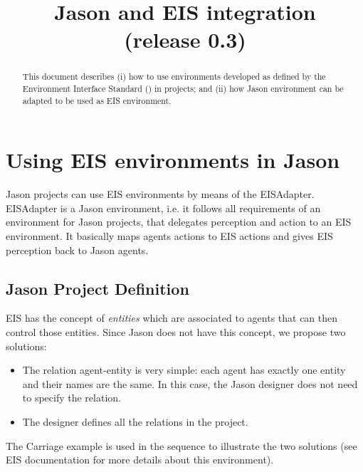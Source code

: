 \documentclass{article}
\begin{document}
\title{Jason and EIS integration \\\small{(release 0.3)}}
\maketitle

\begin{abstract}
  This document describes (i) how to use environments developed as
  defined by the Environment Interface Standard
  () in
   projects; and (ii) how Jason
  environment can be adapted to be used as EIS environment.
\end{abstract}

\tableofcontents


\section*{Using EIS environments in Jason}

Jason projects can use EIS environments by means of  the
EISAdapter. EISAdapter is a Jason environment, i.e. it follows all
requirements of an environment for Jason projects, that delegates
perception and action to an EIS environment. It basically maps agents
actions to EIS actions and gives EIS perception back to Jason agents.


\subsection*{Jason Project Definition}

EIS has the concept of \emph{entities} which are associated to agents
that can then control those entities.  Since Jason does not have this
concept, we propose two solutions:
\begin{itemize}
\item The relation agent-entity is very simple: each agent has exactly
  one entity and their names are the same. In this case, the Jason
  designer does not need to specify the relation.
\item The designer defines all the relations in the project.
\end{itemize}

The Carriage example is used in the sequence to illustrate the two
solutions (see EIS documentation for more details about this
environment). 
\end{document}
